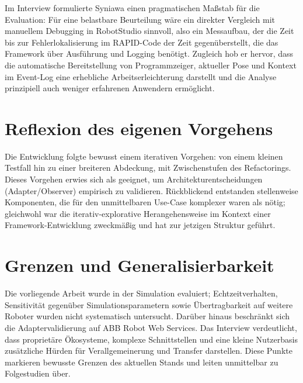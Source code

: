 \noindent
Im Interview formulierte Syniawa einen pragmatischen Maßstab für die Evaluation:
Für eine belastbare Beurteilung wäre ein direkter Vergleich mit manuellem
Debugging in RobotStudio sinnvoll, also ein Messaufbau, der die Zeit bis zur
Fehlerlokalisierung im RAPID-Code der Zeit gegenüberstellt, die das Framework
über Ausführung und Logging benötigt. Zugleich hob er hervor, dass die
automatische Bereitstellung von Programmzeiger, aktueller Pose und Kontext im
Event-Log eine erhebliche Arbeitserleichterung darstellt und die Analyse
prinzipiell auch weniger erfahrenen Anwendern ermöglicht.

\section{Reflexion des eigenen Vorgehens}

Die Entwicklung folgte bewusst einem iterativen Vorgehen: von einem kleinen
Testfall hin zu einer breiteren Abdeckung, mit Zwischenstufen des Refactorings.
Dieses Vorgehen erwies sich als geeignet, um Architekturentscheidungen
(Adapter/Observer) empirisch zu validieren. Rückblickend entstanden stellenweise
Komponenten, die für den unmittelbaren Use-Case komplexer waren als nötig;
gleichwohl war die iterativ-explorative Herangehensweise im Kontext einer
Framework-Entwicklung zweckmäßig und hat zur jetzigen Struktur geführt.

\section{Grenzen und Generalisierbarkeit}

Die vorliegende Arbeit wurde in der Simulation evaluiert; Echtzeitverhalten,
Sensitivität gegenüber Simulationsparametern sowie Übertragbarkeit auf weitere
Roboter wurden nicht systematisch untersucht. Darüber hinaus beschränkt sich die
Adaptervalidierung auf ABB Robot Web Services. Das Interview verdeutlicht, dass
proprietäre Ökosysteme, komplexe Schnittstellen und eine kleine Nutzerbasis
zusätzliche Hürden für Verallgemeinerung und Transfer darstellen. Diese Punkte
markieren bewusste Grenzen des aktuellen Stands und leiten unmittelbar zu
Folgestudien über.


